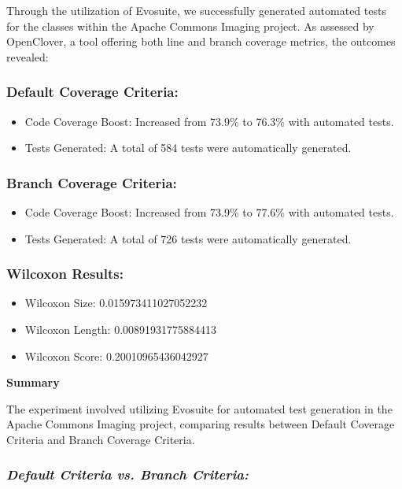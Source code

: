 \documentclass[sigconf]{acmart}
\begin{document}
Through the utilization of Evosuite, we successfully generated automated tests for the classes within the Apache Commons Imaging project. As assessed by OpenClover\cite{openclover}, a tool offering both line and branch coverage metrics, the outcomes revealed:

\subsubsection{\textbf{Default Coverage Criteria:}}

 \begin{itemize}
    \item Code Coverage Boost: Increased from 73.9\% to 76.3\% with automated tests.
    \item Tests Generated: A total of 584 tests were automatically generated.
 \end{itemize}

\subsubsection{\textbf{Branch Coverage Criteria:}}

 \begin{itemize}
    \item Code Coverage Boost: Increased from 73.9\% to 77.6\% with automated tests.
    \item Tests Generated: A total of 726 tests were automatically generated.
 \end{itemize}

\subsubsection{\textbf{Wilcoxon Results:}}

 \begin{itemize}
        \item Wilcoxon Size: 0.015973411027052232
        \item Wilcoxon Length: 0.00891931775884413
        \item Wilcoxon Score: 0.20010965436042927
 \end{itemize}

\textbf{Summary}

The experiment involved utilizing Evosuite for automated test generation in the Apache Commons Imaging project, comparing results between Default Coverage Criteria and Branch Coverage Criteria.

\subsubsection{\textit{Default Criteria vs. Branch Criteria:}}
\end{document}
